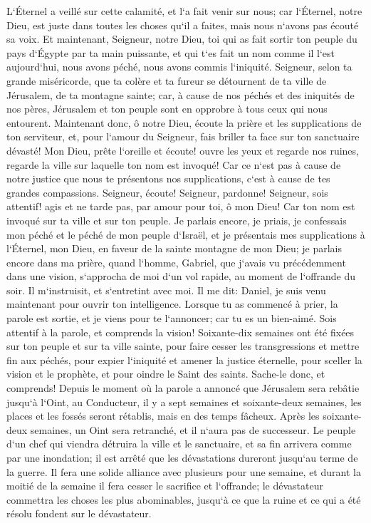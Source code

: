 \verse L`Éternel a veillé sur cette calamité, et l`a fait venir sur nous; car l`Éternel, notre Dieu, est juste dans toutes les choses qu`il a faites, mais nous n`avons pas écouté sa voix. 
\verse Et maintenant, Seigneur, notre Dieu, toi qui as fait sortir ton peuple du pays d`Égypte par ta main puissante, et qui t`es fait un nom comme il l`est aujourd`hui, nous avons péché, nous avons commis l`iniquité. 
\verse Seigneur, selon ta grande miséricorde, que ta colère et ta fureur se détournent de ta ville de Jérusalem, de ta montagne sainte; car, à cause de nos péchés et des iniquités de nos pères, Jérusalem et ton peuple sont en opprobre à tous ceux qui nous entourent. 
\verse Maintenant donc, ô notre Dieu, écoute la prière et les supplications de ton serviteur, et, pour l`amour du Seigneur, fais briller ta face sur ton sanctuaire dévasté! 
\verse Mon Dieu, prête l`oreille et écoute! ouvre les yeux et regarde nos ruines, regarde la ville sur laquelle ton nom est invoqué! Car ce n`est pas à cause de notre justice que nous te présentons nos supplications, c`est à cause de tes grandes compassions. 
\verse Seigneur, écoute! Seigneur, pardonne! Seigneur, sois attentif! agis et ne tarde pas, par amour pour toi, ô mon Dieu! Car ton nom est invoqué sur ta ville et sur ton peuple. 
\verse Je parlais encore, je priais, je confessais mon péché et le péché de mon peuple d`Israël, et je présentais mes supplications à l`Éternel, mon Dieu, en faveur de la sainte montagne de mon Dieu; 
\verse je parlais encore dans ma prière, quand l`homme, Gabriel, que j`avais vu précédemment dans une vision, s`approcha de moi d`un vol rapide, au moment de l`offrande du soir. 
\verse Il m`instruisit, et s`entretint avec moi. Il me dit: Daniel, je suis venu maintenant pour ouvrir ton intelligence. 
\verse Lorsque tu as commencé à prier, la parole est sortie, et je viens pour te l`annoncer; car tu es un bien-aimé. Sois attentif à la parole, et comprends la vision! 
\verse Soixante-dix semaines ont été fixées sur ton peuple et sur ta ville sainte, pour faire cesser les transgressions et mettre fin aux péchés, pour expier l`iniquité et amener la justice éternelle, pour sceller la vision et le prophète, et pour oindre le Saint des saints. 
\verse Sache-le donc, et comprends! Depuis le moment où la parole a annoncé que Jérusalem sera rebâtie jusqu`à l`Oint, au Conducteur, il y a sept semaines et soixante-deux semaines, les places et les fossés seront rétablis, mais en des temps fâcheux. 
\verse Après les soixante-deux semaines, un Oint sera retranché, et il n`aura pas de successeur. Le peuple d`un chef qui viendra détruira la ville et le sanctuaire, et sa fin arrivera comme par une inondation; il est arrêté que les dévastations dureront jusqu`au terme de la guerre. 
\verse Il fera une solide alliance avec plusieurs pour une semaine, et durant la moitié de la semaine il fera cesser le sacrifice et l`offrande; le dévastateur commettra les choses les plus abominables, jusqu`à ce que la ruine et ce qui a été résolu fondent sur le dévastateur. 


